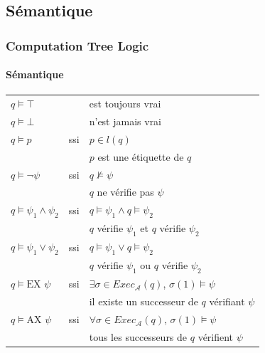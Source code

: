 \documentclass[11pt]{beamer}
\begin{document}
\subsection{Sémantique}
\begin{frame}
    \frametitle{Computation Tree Logic}
    \framesubtitle{Sémantique}

    \footnotesize
    \begin{tabular}{lcl}
    $q \vDash \top$ && est toujours vrai\\
    $q \vDash \bot$ && n'est jamais vrai\\
    $q \vDash p$ &ssi&
    $p \in l (q)$\\
    \pause[2]&& $p$ est une étiquette de $q$\pause[1]\\
    $q \vDash \neg \psi$ &ssi&
    $q \nvDash \psi$\\
    \pause[2]&& $q$ ne vérifie pas $\psi$\pause[1]\\

    $q \vDash \psi_1 \land \psi_2$ &ssi&
    $q \vDash \psi_1\land q \vDash \psi_2$\\
    \pause[2]&& $q$ vérifie $\psi_1$ et $q$ vérifie $\psi_2$\pause[1]\\

    $q \vDash \psi_1 \lor \psi_2$ &ssi&
    $q \vDash \psi_1\lor q \vDash \psi_2$\\
    \pause[2]&& $q$ vérifie $\psi_1$ ou $q$ vérifie $\psi_2$\pause[1]\\

    $q \vDash \mbox{EX } \psi$ &ssi&
    $\exists \sigma \in Exec_\mathcal{A}(q)$, $\sigma(1) \vDash \psi$\\
    \pause[2]&& il existe un successeur de $q$ vérifiant $\psi$\pause[1]\\

    $q \vDash \mbox{AX } \psi$ &ssi&
    $\forall \sigma \in Exec_\mathcal{A}(q)$, $\sigma(1) \vDash \psi$\\
    \pause[2]&& tous les successeurs de $q$ vérifient $\psi$\pause[1]\\

    \end{tabular}
\end{frame}
\end{document}
